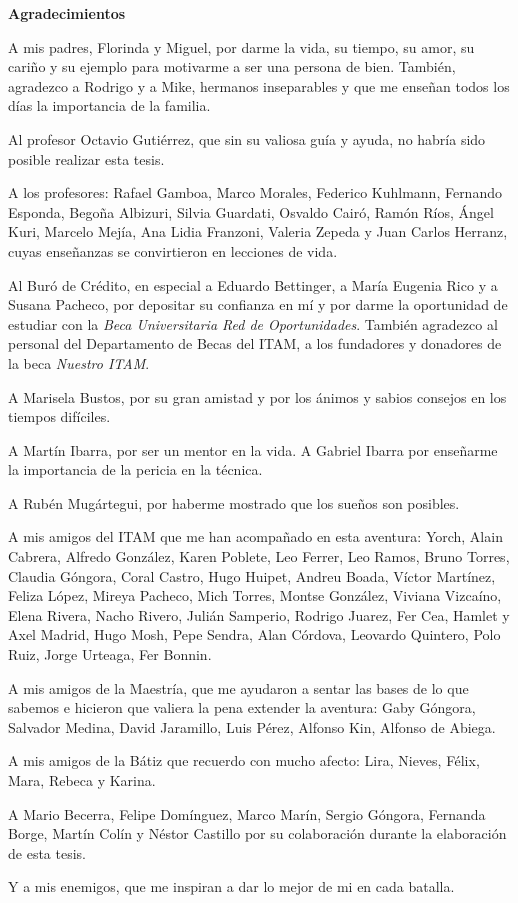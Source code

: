 \begin{center}
{\huge \bfseries Agradecimientos\\}
\end{center}

A mis padres, Florinda y Miguel, por darme la vida, su tiempo, su amor, su cariño y su ejemplo para motivarme a ser una persona de bien. También, agradezco a Rodrigo y a Mike, hermanos inseparables y que me enseñan todos los días la importancia de la familia.

Al profesor Octavio Gutiérrez, que sin su valiosa guía y ayuda, no habría sido posible realizar esta tesis.

A los profesores: Rafael Gamboa, Marco Morales, Federico Kuhlmann, Fernando Esponda, Begoña Albizuri, Silvia Guardati, Osvaldo Cairó, Ramón Ríos, Ángel Kuri, Marcelo Mejía, Ana Lidia Franzoni, Valeria Zepeda y Juan Carlos Herranz, cuyas enseñanzas se convirtieron en lecciones de vida.

Al Buró de Crédito, en especial a Eduardo Bettinger, a María Eugenia Rico y a Susana Pacheco, por depositar su confianza en mí y por darme la oportunidad de estudiar con la \emph{Beca Universitaria Red de Oportunidades}. También agradezco al personal del Departamento de Becas del ITAM, a los fundadores y donadores de la beca \emph{Nuestro ITAM}.

A Marisela Bustos, por su gran amistad y por los ánimos y sabios consejos en los tiempos difíciles.

A Martín Ibarra, por ser un mentor en la vida. A Gabriel Ibarra por enseñarme la importancia de la pericia en la técnica.

A Rubén Mugártegui, por haberme mostrado que los sueños son posibles.

A mis amigos del ITAM que me han acompañado en esta aventura: Yorch, Alain Cabrera, Alfredo González, Karen Poblete, Leo Ferrer, Leo Ramos, Bruno Torres, Claudia Góngora, Coral Castro, Hugo Huipet, Andreu Boada, Víctor Martínez, Feliza López, Mireya Pacheco, Mich Torres, Montse González, Viviana Vizcaíno, Elena Rivera, Nacho Rivero, Julián Samperio, Rodrigo Juarez, Fer Cea, Hamlet y Axel Madrid, Hugo Mosh, Pepe Sendra, Alan Córdova, Leovardo Quintero, Polo Ruiz, Jorge Urteaga, Fer Bonnin.

A mis amigos de la Maestría, que me ayudaron a sentar las bases de lo que sabemos e hicieron que valiera la pena extender la aventura: Gaby Góngora, Salvador Medina, David Jaramillo, Luis Pérez, Alfonso Kin, Alfonso de Abiega.

A mis amigos de la Bátiz que recuerdo con mucho afecto: Lira, Nieves, Félix, Mara, Rebeca y Karina.

A Mario Becerra, Felipe Domínguez, Marco Marín, Sergio Góngora, Fernanda Borge, Martín Colín y Néstor Castillo por su colaboración durante la elaboración de esta tesis.

Y a mis enemigos, que me inspiran a dar lo mejor de mi en cada batalla.
\clearpage